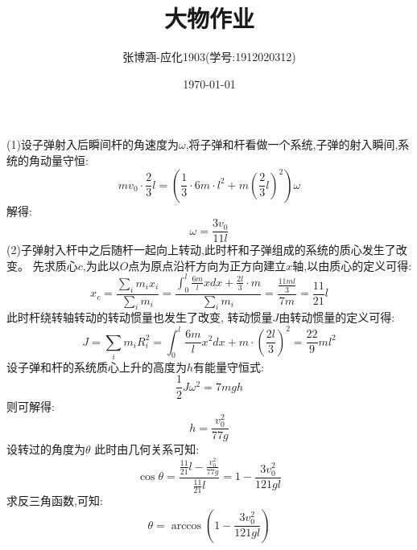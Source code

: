 \documentclass{article}
\title{大物作业}
\author{张博涵-应化1903(学号:1912020312)}
\date{\today}
\begin{document}
	\maketitle
	
	(1)设子弹射入后瞬间杆的角速度为$\omega$,将子弹和杆看做一个系统,子弹的射入瞬间,系统的角动量守恒:
	$$mv_0 \cdot \frac{2}{3} l = (\frac {1}{3} \cdot 6m \cdot l^2 + m(\frac {2}{3}l)^2)\omega$$
	解得:
	$$\omega = \frac{3v_0}{11l}$$
	(2)子弹射入杆中之后随杆一起向上转动,此时杆和子弹组成的系统的质心发生了改变。
	先求质心$c$,为此以$O$点为原点沿杆方向为正方向建立$ x $轴,以由质心的定义可得:
	\[
	x_c=\frac{\displaystyle\sum\limits_{i} m_ix_i}{\displaystyle\sum _i m_i}
	=\frac{\displaystyle\int_{0}^{l} \frac{6m}{l}xdx+\frac{2l}{3}\cdot m}{\displaystyle\sum _i m_i}
	=\frac{\displaystyle\frac{11ml}{3} }{7m}=\frac{11}{21}l
	\]
	此时杆绕转轴转动的转动惯量也发生了改变,
	转动惯量$J$由转动惯量的定义可得:
	\[
	J=\sum\limits_{i} m_iR_i^2
	=\displaystyle\int_{0}^{l}\frac{6m}{l}x^2dx+m \cdot (\frac{2l}{3})^2
	=\frac{22}{9}ml^2
	\]
	设子弹和杆的系统质心上升的高度为$h$有能量守恒式:
	$$\frac{1}{2}J\omega^2=7mgh$$
	则可解得:$$h=\frac{v_0^2}{77g}$$
	设转过的角度为$\theta$ 此时由几何关系可知:$$\cos\theta=\displaystyle\frac{\displaystyle\frac{11}{21}l-\displaystyle\frac{v_0^2}{77g}}{\displaystyle\frac{11}{21}l}=1-\frac{3v_0^2}{121gl}$$
	求反三角函数,可知:
	$$\theta=\arccos(1-\frac{3v_0^2}{121gl})$$
	
	
\end{document}
